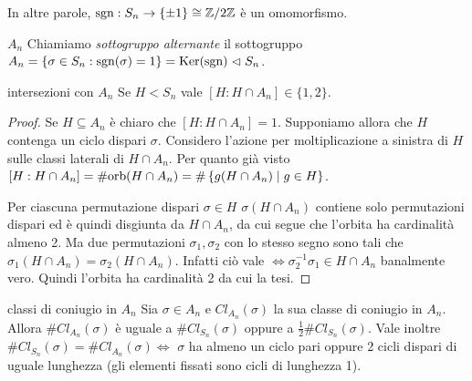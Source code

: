     In altre parole, $\text{sgn}: S_n \rightarrow \left\{ \pm 1 \right\} \cong \mathbb{Z}/2\mathbb{Z}$ è un omomorfismo.
\begin{definition}{$A_n$}
    Chiamiamo \emph{sottogruppo alternante} il sottogruppo $A_n = \{\sigma \in S_n : \text{sgn} (\sigma) = 1\} = \text{Ker}(\text{sgn}) \vartriangleleft S_n$.
\end{definition}
\begin{proposition}{intersezioni con $A_n$}
    Se $H < S_n$ vale $[H : H \cap A_n] \in \{1, 2\}$.
\end{proposition}
\begin{proof}
    Se $H \subseteq A_n$ è chiaro che $[H : H \cap A_n] = 1$. Supponiamo allora che $H$ contenga un ciclo dispari $\sigma$. 
    Considero l'azione per moltiplicazione a sinistra di $H$ sulle classi laterali di $H \cap A_n$. Per quanto già visto $[H : H \cap A_n] = \#\text{orb}(H \cap A_n) = \#\left\{ g(H \cap A_n)  \mid  g \in H \right\}$.

    Per ciascuna permutazione dispari $\sigma \in H$ $\sigma(H \cap A_n)$ contiene solo permutazioni dispari ed è quindi disgiunta da $H \cap A_n$, da cui segue che l'orbita ha cardinalità almeno 2. Ma due permutazioni $\sigma_1,\sigma_2$ con lo stesso segno sono tali che $\sigma_1(H \cap A_n) = \sigma_2(H \cap A_n)$. Infatti ciò vale $\iff \sigma_2^{-1}\sigma_1 \in H \cap A_n$ banalmente vero. Quindi l'orbita ha cardinalità 2 da cui la tesi.
\end{proof}
\begin{proposition}{classi di coniugio in $A_n$}
    Sia $\sigma \in A_n$ e $Cl_{A_n}(\sigma)$ la sua classe di coniugio in $A_n$. Allora $\#Cl_{A_n}(\sigma)$ è uguale a $\#Cl_{S_n}(\sigma)$ oppure a $\frac{1}{2}\#Cl_{S_n}(\sigma)$. Vale inoltre $\#Cl_{S_n}(\sigma) = \#Cl_{A_n}(\sigma) \iff$ $\sigma$ ha almeno un ciclo pari oppure 2 cicli dispari di uguale lunghezza (gli elementi fissati sono cicli di lunghezza 1).
\end{proposition}
